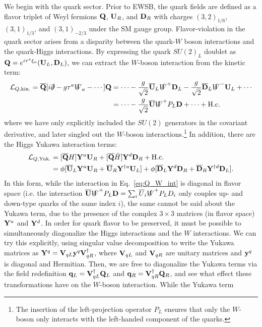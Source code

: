 We begin with the quark sector. Prior to EWSB, the quark fields are defined as a flavor triplet of Weyl fermions ${\bf Q}$, ${\bf U}_{R}$, and ${\bf D}_{R}$ with charges $(3, 2)_{1/6}$, $(3, 1)_{1/3}$, and $(3, 1)_{-2/3}$ under the SM gauge group. Flavor-violation in the quark sector arises from a disparity between the quark-$W$ boson interactions and the quark-Higgs interactions. By expressing the quark $SU(2)_L$ doublet as ${\bf Q} = e^{i\tau^a\xi_a}({\bf U}_L, {\bf D}_L)$, we can extract the $W$-boson interaction from the kinetic term:
\begin{align}
    {\cal L}_{Q,{\rm kin.}} = \overline{\bf Q}[i\slashed{\partial}-g\tau^a \slashed{W}_a-\cdots]{\bf Q} &=\cdots - \frac{g}{\sqrt{2}}\overline{\bf U}_L \slashed{W}^+{\bf D}_L - \frac{g}{\sqrt{2}}\overline{\bf D}_L \slashed{W}^-{\bf U}_L+\cdots \nonumber\\
    &=\cdots - \frac{g}{\sqrt{2}}\overline{\bf U}{\slashed{W}}^+P_L{\bf D} + \cdots + {\rm H.c.}\label{eq:Q_W_int}
\end{align}
where we have only explicitly included the $SU(2)$ generators in the covariant derivative, and later singled out the $W$-boson interactions.\footnote{The insertion of the left-projection operator $P_L$ ensures that only the $W$-boson only interacts with the left-handed component of the quarks.} In addition, there are the Higgs Yukawa interaction terms:
\begin{align}
    {\cal L}_{Q,{\rm Yuk.}} &=  [\overline{\bf Q}H]{\bf Y}^u{\bf U}_R + [\overline{\bf Q}\tilde{H}]{\bf Y}^d{\bf D}_R + {\rm H.c.}\nonumber \\
    &= \phi[\overline{\bf U}_L{\bf Y}^u {\bf U}_R+\overline{\bf U}_R{\bf Y}^{\dagger u} {\bf U}_L] + \phi[\overline{\bf D}_L{\bf Y}^d {\bf D}_R+\overline{\bf D}_R{\bf Y}^{\dagger d} {\bf D}_L].
\end{align}
In this form, while the interaction in Eq.~\ref{eq:Q_W_int} is diagonal in flavor space (i.e. the interaction $\overline{\bf U}{\slashed{W}^+}P_L{\bf D} = \sum_i\overline{U}_i \slashed{W}^+P_LD_i$ only couples up- and down-type quarks of the same index $i$), the same cannot be said about the Yukawa term, due to the presence of the complex $3\times 3$ matrices (in flavor space) ${\bf Y}^u$ and ${\bf Y}^d$. In order for quark flavor to be preserved, it must be possible to simultaneously diagonalize the Higgs interactions and the $W$ interactions. We can try this explicitly, using singular value decomposition to write the Yukawa matrices as ${\bf Y}^q = {\bf V}_{qL}{\bf y}^q {\bf V}_{qR}^\dagger$, where ${\bf V}_{qL}$ and ${\bf V}_{qR}$ are unitary matrices and ${\bf y}^q$ is diagonal and Hermitian. Then, we are free to diagonalize the Yukawa terms via the field redefinition ${\bf q}_L = {\bf V}_{qL}^\dagger {\bf Q}_L$ and ${\bf q}_R = {\bf V}_{qR}^\dagger {\bf Q}_R$, and see what effect these transformations have on the $W$-boson interaction. While the Yukawa term 

